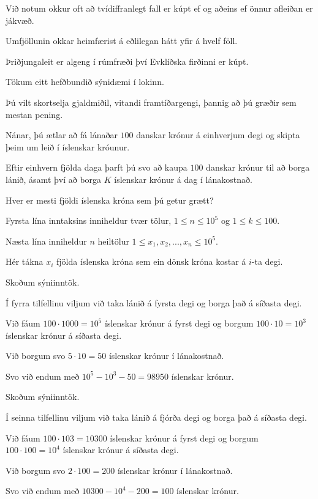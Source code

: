 {
	{
		\item<1-> Við notum okkur oft að tvídiffranlegt fall er kúpt ef og aðeins ef önnur afleiðan er jákvæð.
		\item<2-> Umfjöllunin okkar heimfærist á eðlilegan hátt yfir á hvelf föll.
		\item<3-> Þriðjungaleit er algeng í rúmfræði því Evklíðska firðinni er kúpt.
	}
}

{
}

{
	{
		\item<1-> Tökum eitt hefðbundið sýnidæmi í lokinn.
		\item<2-> Þú vilt skortselja gjaldmiðil, vitandi framtíðargengi, þannig að þú græðir sem mestan pening.
		\item<3-> Nánar, þú ætlar að fá lánaðar $100$ danskar krónur á einhverjum degi og skipta þeim um leið í íslenskar króunur.
		\item<4-> Eftir einhvern fjölda daga þarft þú svo að kaupa $100$ danskar krónur til að borga lánið,
					ásamt því að borga $K$ íslenskar krónur á dag í lánakostnað.
		\item<5-> Hver er mesti fjöldi íslenska króna sem þú getur grætt?
		\item<6-> Fyrsta lína inntaksins inniheldur tvær tölur, $1 \leq n \leq 10^5$ og $1 \leq k \leq 100$.
		\item<7-> Næsta lína inniheldur $n$ heiltölur $1 \leq x_1, x_2, ..., x_n \leq 10^5$.
		\item<8-> Hér tákna $x_i$ fjölda íslenska króna sem ein dönsk króna kostar á $i$-ta degi.
	}
}

{
	{
		\item<1-> Skoðum sýniinntök.
		\item<2->[]
		\item<3-> Í fyrra tilfellinu viljum við taka lánið á fyrsta degi og borga það á síðasta degi.
		\item<4-> Við fáum $100 \cdot 1000 = 10^5$ íslenskar krónur á fyrst degi og borgum $100 \cdot 10 = 10^3$ íslenskar krónur á síðasta degi.
		\item<5-> Við borgum svo $5 \cdot 10 = 50$ íslenskar krónur í lánakostnað.
		\item<6-> Svo við endum með $10^5 - 10^3 - 50 = 98950$ íslenskar krónur.
	}
}

{
	{
		\item<1-> Skoðum sýniinntök.
		\item<2->[]
		\item<3-> Í seinna tilfellinu viljum við taka lánið á fjórða degi og borga það á síðasta degi.
		\item<4-> Við fáum $100 \cdot 103 = 10300$ íslenskar krónur á fyrst degi og borgum $100 \cdot 100 = 10^4$ íslenskar krónur á síðasta degi.
		\item<5-> Við borgum svo $2 \cdot 100 = 200$ íslenskar krónur í lánakostnað.
		\item<6-> Svo við endum með $10300 - 10^4 - 200 = 100$ íslenskar krónur.
	}
}

